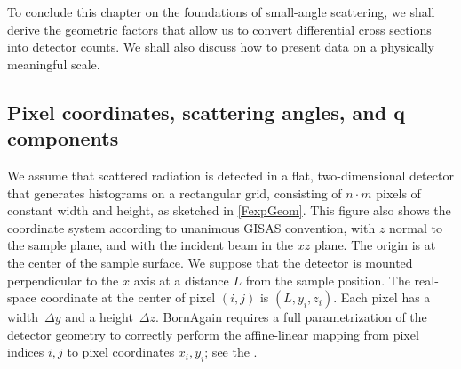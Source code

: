 To conclude this chapter on the foundations of small-angle scattering,
we shall derive the geometric factors
that allow us to convert differential cross sections into detector counts.
We shall also discuss how to present data on a physically meaningful scale.

\subsection{Pixel coordinates, scattering angles, and $\symbf{q}$ components}

We assume that scattered radiation is detected in a flat,
two-dimensional detector
that generates histograms on a rectangular grid,
consisting of $n\cdot m$ pixels of constant width and height,
as sketched in \cref{FexpGeom}.
This figure also shows the coordinate system
%
%
according to unanimous GISAS convention,
with $z$ normal to the sample plane,
and with the incident beam in the $xz$ plane.
The origin is at the center of the sample surface.
We suppose that the detector is mounted perpendicular to the $x$ axis
at a distance $L$ from the sample position.
The real-space coordinate at the center of pixel $(i,j)$ is $(L,y_i,z_i)$.
Each pixel has a width~$\Delta y$ and a height~$\Delta z$.
%
%
BornAgain requires a full parametrization of the detector geometry
%
to correctly perform the affine-linear mapping from pixel indices $i,j$
to pixel coordinates $x_i,y_i$;
see the .

